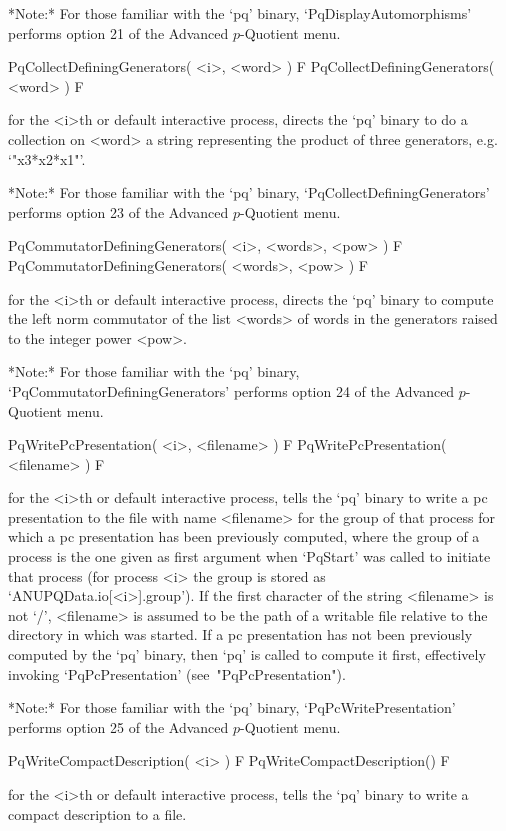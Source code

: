 *Note:* 
For  those  familiar  with  the  `pq'  binary,   `PqDisplayAutomorphisms'
performs option 21 of the Advanced $p$-Quotient menu.

\>PqCollectDefiningGenerators( <i>, <word> ) F
\>PqCollectDefiningGenerators( <word> ) F

for the <i>th or default interactive {\ANUPQ} process, directs  the  `pq'
binary to do a collection on <word> a string representing the product  of
three generators, e.g. `"x3*x2*x1"'.

*Note:*
For those familiar with the  `pq'  binary,  `PqCollectDefiningGenerators'
performs option 23 of the Advanced $p$-Quotient menu.

\>PqCommutatorDefiningGenerators( <i>, <words>, <pow> ) F
\>PqCommutatorDefiningGenerators( <words>, <pow> ) F

for the <i>th or default interactive {\ANUPQ} process, directs  the  `pq'
binary to compute the left norm commutator of the list <words>  of  words
in the generators raised to the integer power <pow>.

*Note:*
For those familiar with the `pq' binary, `PqCommutatorDefiningGenerators'
performs option 24 of the Advanced $p$-Quotient menu.

\>PqWritePcPresentation( <i>, <filename> ) F
\>PqWritePcPresentation( <filename> ) F

for the <i>th or default interactive {\ANUPQ}  process,  tells  the  `pq'
binary to write a pc presentation to the file with  name  <filename>  for
the group of that process for which a pc presentation has been previously
computed, where the group of a process is the one given as first argument
when `PqStart' was called to initiate that process (for process  <i>  the
group is stored as `ANUPQData.io[<i>].group'). If the first character  of
the string <filename> is not `/', <filename> is assumed to be the path of
a writable file relative to the directory in which {\GAP} was started. If
a pc presentation has not been previously computed by  the  `pq'  binary,
then  `pq'  is  called  to  compute  it   first,   effectively   invoking
`PqPcPresentation' (see~"PqPcPresentation").

*Note:* For those familiar with the `pq' binary,  `PqPcWritePresentation'
performs option 25 of the Advanced $p$-Quotient menu.

\>PqWriteCompactDescription( <i> ) F
\>PqWriteCompactDescription() F

for the <i>th or default interactive {\ANUPQ}  process,  tells  the  `pq'
binary to write a compact description to a file.

